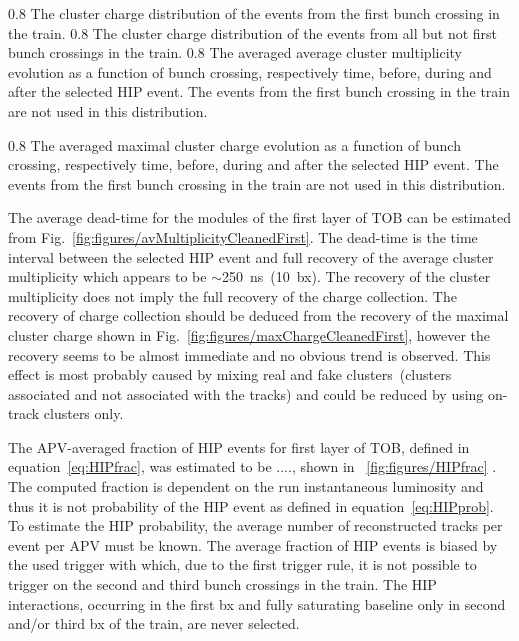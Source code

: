                  {0.8}       %
                 {The cluster charge distribution of the events from the first bunch crossing in the train. } %
                 {0.8}       %
                 {The cluster charge distribution of the events from all but not first bunch crossings in the train. } %
                 {0.8}       %
                 {The averaged average cluster multiplicity evolution as a function of bunch crossing, respectively time, before, during and after the selected HIP event. The events from the first bunch crossing in the train are not used in this distribution. } %

                 {0.8}       %
                 {The averaged maximal cluster charge evolution as a function of bunch crossing, respectively time, before, during and after the selected HIP event.  The events from the first bunch crossing in the train are not used in this distribution. } %

The average dead-time for the modules of the first layer of TOB can be estimated from Fig.~\ref{fig:figures/avMultiplicityCleanedFirst}. The dead-time is the time interval between the selected HIP event and full recovery of the average cluster multiplicity which appears to be $\sim$250~ns~(10~bx). The recovery of the cluster multiplicity does not imply the full recovery of the charge collection. The recovery of charge collection should be deduced from the recovery of the maximal cluster charge shown in Fig.~\ref{fig:figures/maxChargeCleanedFirst}, however the recovery seems to be almost immediate and no obvious trend is observed. This effect is most probably caused by mixing real and fake clusters~(clusters associated and not associated with the tracks) and could be reduced by using on-track clusters only.

The APV-averaged fraction of HIP events for first layer of TOB, defined in equation~\ref{eq:HIPfrac}, was estimated to be ...., shown in ~\ref{fig:figures/HIPfrac} . The computed fraction is dependent on the run instantaneous luminosity and thus it is not probability of the HIP event as defined in equation~\ref{eq:HIPprob}. To estimate the HIP probability, the average number of reconstructed tracks per event per APV must be known. The average fraction of HIP events is biased by the used trigger with which, due to the first trigger rule, it is not possible to trigger on the second and third bunch crossings in the train. The HIP interactions, occurring in the first bx and fully saturating baseline only in second and/or third bx of the train, are never selected.
 
